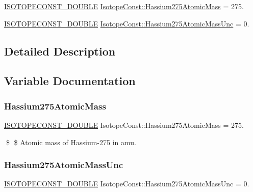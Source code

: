 \begin{DoxyCompactItemize}
\item 
\mbox{\hyperlink{group___isotope_const-_macros_ga8f45a7272ce02c0b4c65c44636ed719a}{I\+S\+O\+T\+O\+P\+E\+C\+O\+N\+S\+T\+\_\+\+D\+O\+U\+B\+LE}} \mbox{\hyperlink{group___isotope_const-_hassium-_hs275_ga7f629fc02b7c858ae7433ef484e78597}{Isotope\+Const\+::\+Hassium275\+Atomic\+Mass}} = 275.
\item 
\mbox{\hyperlink{group___isotope_const-_macros_ga8f45a7272ce02c0b4c65c44636ed719a}{I\+S\+O\+T\+O\+P\+E\+C\+O\+N\+S\+T\+\_\+\+D\+O\+U\+B\+LE}} \mbox{\hyperlink{group___isotope_const-_hassium-_hs275_ga7168e2beac48e78bdbff7b4e6418558f}{Isotope\+Const\+::\+Hassium275\+Atomic\+Mass\+Unc}} = 0.
\end{DoxyCompactItemize}


\subsection{Detailed Description}


\subsection{Variable Documentation}
\mbox{\label{group___isotope_const-_hassium-_hs275_ga7f629fc02b7c858ae7433ef484e78597}} 
\subsubsection{\texorpdfstring{Hassium275\+Atomic\+Mass}{Hassium275AtomicMass}}
{\footnotesize\ttfamily \mbox{\hyperlink{group___isotope_const-_macros_ga8f45a7272ce02c0b4c65c44636ed719a}{I\+S\+O\+T\+O\+P\+E\+C\+O\+N\+S\+T\+\_\+\+D\+O\+U\+B\+LE}} Isotope\+Const\+::\+Hassium275\+Atomic\+Mass = 275.}

\$ \$ Atomic mass of Hassium-\/275 in amu. \mbox{\label{group___isotope_const-_hassium-_hs275_ga7168e2beac48e78bdbff7b4e6418558f}} 
\subsubsection{\texorpdfstring{Hassium275\+Atomic\+Mass\+Unc}{Hassium275AtomicMassUnc}}
{\footnotesize\ttfamily \mbox{\hyperlink{group___isotope_const-_macros_ga8f45a7272ce02c0b4c65c44636ed719a}{I\+S\+O\+T\+O\+P\+E\+C\+O\+N\+S\+T\+\_\+\+D\+O\+U\+B\+LE}} Isotope\+Const\+::\+Hassium275\+Atomic\+Mass\+Unc = 0.}

